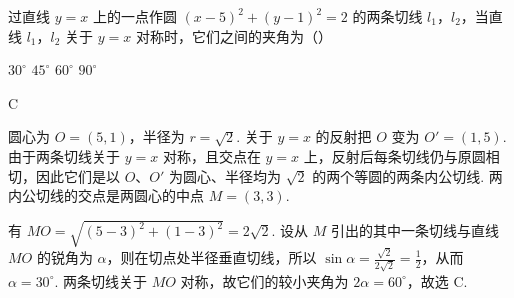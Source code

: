 \begin{problem}
过直线 \( y = x \) 上的一点作圆 \( (x - 5)^2 + (y - 1)^2 = 2 \) 的两条切线 \(l_1\)，\(l_2\)，当直线 \(l_1\)，\(l_2\) 关于 \( y = x \) 对称时，它们之间的夹角为（\quad）

\choices
    {\(30^{\circ}\)}
    {\(45^{\circ}\)}
    {\(60^{\circ}\)}
    {\(90^{\circ}\)}

\begin{answer}
C
\end{answer}

\begin{solution}
圆心为 \(O=(5,1)\)，半径为 \(r=\sqrt{2}\). 关于 \(y=x\) 的反射把 \(O\) 变为 \(O'=(1,5)\). 由于两条切线关于 \(y=x\) 对称，且交点在 \(y=x\) 上，反射后每条切线仍与原圆相切，因此它们是以 \(O\)、\(O'\) 为圆心、半径均为 \(\sqrt2\) 的两个等圆的两条内公切线. 两内公切线的交点是两圆心的中点 \(M=(3,3)\).

有 \(MO=\sqrt{(5-3)^2+(1-3)^2}=2\sqrt2\). 设从 \(M\) 引出的其中一条切线与直线 \(MO\) 的锐角为 \(\alpha\)，则在切点处半径垂直切线，所以 \(\sin\alpha=\frac{\sqrt2}{2\sqrt2}=\frac12\)，从而 \(\alpha=30^{\circ}\). 两条切线关于 \(MO\) 对称，故它们的较小夹角为 \(2\alpha=60^{\circ}\)，故选 C.
\end{solution}
\end{problem}

